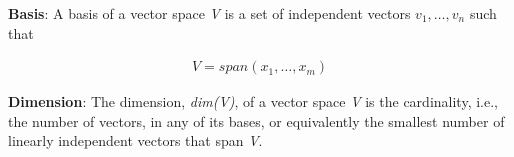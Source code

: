 \documentclass[12pt]{article}
\newenvironment{definition}[2][Definition]{\begin{trivlist}
\item[\hskip \labelsep {\bfseries #1}\hskip \labelsep {\bfseries #2}]}{\end{trivlist}}
\begin{document}
\begin{definition}{1.4} \textbf{Basis}: A basis of a vector space \emph{V} is a set of independent vectors \({v_1,\dots, v_n}\) such that

\begin{equation}
\begin{split}
V = span(x_1, \dots,x_m)
\end{split}
\end{equation}

\end{definition}
\begin{definition}{1.5} \textbf{Dimension}: The dimension, \emph{dim(V)}, of a vector space \emph{V} is the cardinality, i.e., the number of vectors, in any of its bases, or equivalently the smallest number of linearly independent vectors that span \emph{V}.
\end{definition}
\end{document}

